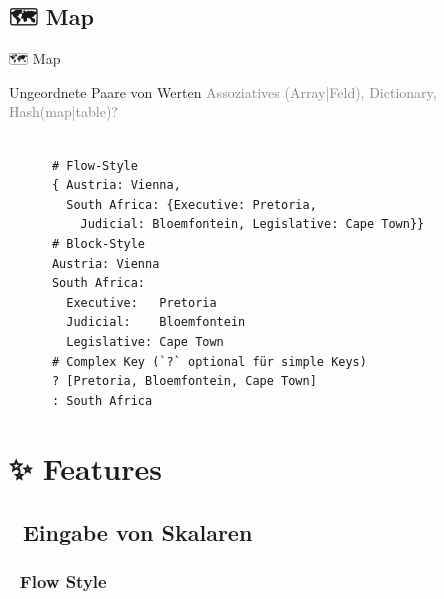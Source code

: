 \documentclass{beamer}
\begin{document}
\subsection{🗺 Map}

\begin{frame}[fragile]{🗺 Map}
  \begin{block}{Ungeordnete Paare von Werten}
    \textcolor{gray}{Assoziatives (Array|Feld), Dictionary, Hash(map|table)?}\\\\
    \begin{verbatim}
      # Flow-Style
      { Austria: Vienna,
        South Africa: {Executive: Pretoria,
          Judicial: Bloemfontein, Legislative: Cape Town}}
      # Block-Style
      Austria: Vienna
      South Africa:
        Executive:   Pretoria
        Judicial:    Bloemfontein
        Legislative: Cape Town
      # Complex Key (`?` optional für simple Keys)
      ? [Pretoria, Bloemfontein, Cape Town]
      : South Africa
    \end{verbatim}
  \end{block}
\end{frame}

\section{✨ Features}
\subsection{📝 Eingabe von Skalaren}

\subsubsection{🌊 Flow Style}
\end{document}
